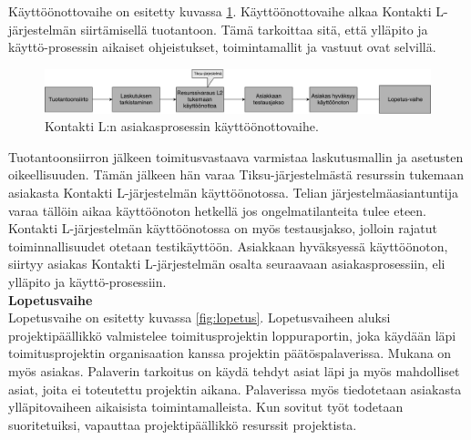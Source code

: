\documentclass[finnish,12pt,a4paper,pdftex]{article}
\begin{document}

Käyttöönottovaihe on esitetty kuvassa \ref{fig:kayttoonotto}. Käyttöönottovaihe alkaa Kontakti L-järjestelmän siirtämisellä tuotantoon. Tämä tarkoittaa sitä, että ylläpito ja käyttö-prosessin aikaiset ohjeistukset, toimintamallit ja vastuut ovat selvillä. 

\begin{figure}[!h]
    \centering
    \includegraphics[scale=0.3]{images/kayttoonotto.pdf}
    \caption{Kontakti L:n asiakasprosessin käyttöönottovaihe.}
    \label{fig:kayttoonotto}
\end{figure}

Tuotantoonsiirron jälkeen toimitusvastaava varmistaa laskutusmallin ja asetusten oikeellisuuden. Tämän jälkeen hän varaa Tiksu-järjestelmästä resurssin tukemaan asiakasta Kontakti L-järjestelmän käyttöönotossa. Telian järjestelmäasiantuntija varaa tällöin aikaa käyttöönoton hetkellä jos ongelmatilanteita tulee eteen. Kontakti L-järjestelmän käyttöönotossa on myös testausjakso, jolloin rajatut toiminnallisuudet otetaan testikäyttöön. Asiakkaan hyväksyessä käyttöönoton, siirtyy asiakas Kontakti L-järjestelmän osalta seuraavaan asiakasprosessiin, eli ylläpito ja käyttö-prosessiin.\\


\textbf{Lopetusvaihe}\\

Lopetusvaihe on esitetty kuvassa  \ref{fig:lopetus}. Lopetusvaiheen aluksi projektipäällikkö valmistelee toimitusprojektin loppuraportin, joka käydään läpi toimitusprojektin organisaation kanssa projektin päätöspalaverissa. Mukana on myös asiakas. Palaverin tarkoitus on käydä tehdyt asiat läpi ja myös mahdolliset asiat, joita ei toteutettu projektin aikana. Palaverissa myös tiedotetaan asiakasta ylläpitovaiheen aikaisista toimintamalleista. Kun sovitut työt todetaan suoritetuiksi, vapauttaa projektipäällikkö resurssit projektista.\\
\end{document}
